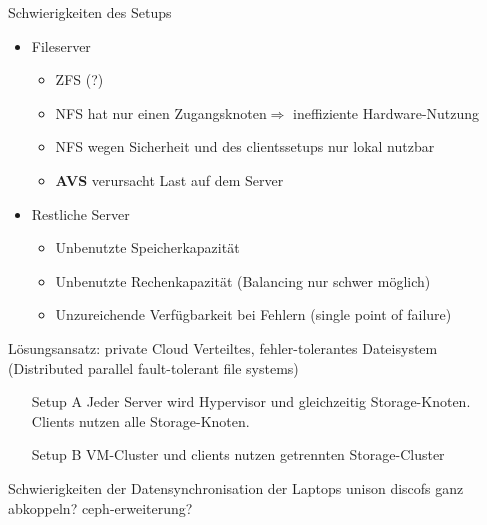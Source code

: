 \documentclass[hyperref={xetex}]{beamer}
\begin{document}
\begin{frame}{Schwierigkeiten des Setups}

	\begin{itemize}
		\item Fileserver
			\begin{itemize}
				\item ZFS  (?)
				\item NFS hat nur einen Zugangsknoten$\Rightarrow$ ineffiziente Hardware-Nutzung  
                \item NFS wegen Sicherheit und des clientssetups nur lokal nutzbar
                \item \textbf{AVS} verursacht Last auf dem Server
            \end{itemize} 
		\item <2> Restliche Server
			\begin{itemize}
				\item Unbenutzte Speicherkapazit\"at
				\item Unbenutzte Rechenkapazit\"at (Balancing nur schwer möglich)
				\item Unzureichende Verf\"ugbarkeit bei Fehlern (single point of failure)
			\end{itemize}
	\end{itemize}
\end{frame}


\begin{frame}{L\"osungsansatz: private Cloud}
		Verteiltes, fehler-tolerantes Dateisystem (Distributed parallel fault-tolerant file systems)
	
	\begin{itemize}
		\item [Setup A] Jeder Server wird Hypervisor und gleichzeitig Storage-Knoten. Clients nutzen alle Storage-Knoten.
        \item [Setup B] VM-Cluster und clients nutzen getrennten Storage-Cluster
	\end{itemize}

\end{frame}
\begin{frame}{Schwierigkeiten der Datensynchronisation der Laptops}
unison    
discofs
ganz abkoppeln?
ceph-erweiterung?
\end{frame}
\end{document}
